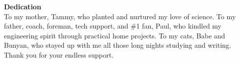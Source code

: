 \hspace{0pt}\vfill
\centering\large\textbf{Dedication}\\
\normalsize\vspace{\baselineskip}
 To my mother, Tammy, who planted and nurtured my love of science. To my father, coach, foreman, tech support, and \#1 fan, Paul, who kindled my engineering spirit through practical home projects. To my cats, Babe and Bunyan, who stayed up with me all those long nights studying and writing. Thank you for your endless support.
\vfill\hspace{0pt}